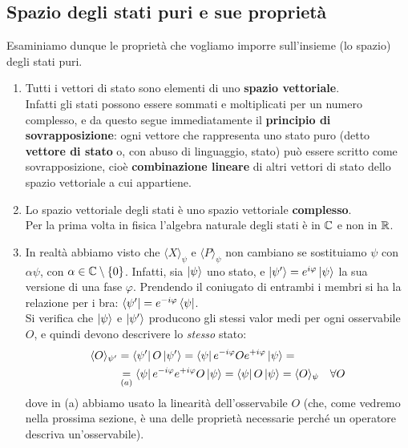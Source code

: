 \documentclass[FisicaTeorica.tex]{subfiles}
\begin{document}
\subsection{Spazio degli stati puri e sue proprietà}
Esaminiamo dunque le proprietà che vogliamo imporre sull'insieme (lo spazio) degli stati puri.
\begin{enumerate}
    \item Tutti i vettori di stato sono elementi di uno \textbf{spazio vettoriale}. \\
    Infatti gli stati possono essere sommati e moltiplicati per un numero complesso, e da questo segue immediatamente il \textbf{principio di sovrapposizione}: ogni vettore che rappresenta uno stato puro (detto \textbf{vettore di stato} o, con abuso di linguaggio, stato) può essere scritto come sovrapposizione, cioè \textbf{combinazione lineare} di altri vettori di stato dello spazio vettoriale a cui appartiene.
    \item Lo spazio vettoriale degli stati è uno spazio vettoriale \textbf{complesso}. \\
    Per la prima volta in fisica l'algebra naturale degli stati è in $\mathbb{C}$ e non in $\mathbb{R}$.
    \item In realtà abbiamo visto che $\langle X\rangle_\psi$ e $\langle P\rangle_\psi$ non cambiano se sostituiamo $\psi$ con $\alpha \psi$, con $\alpha \in \mathbb{C}\setminus \{0\}$. Infatti, sia $\Ket{\psi}$ uno stato, e $\Ket{\psi'} = e^{i\varphi}\Ket{\psi}$ la sua versione  di una fase $\varphi$. Prendendo il coniugato di entrambi i membri si ha la relazione per i bra: $\Bra{\psi'} = e^{-i\varphi}\Bra{\psi}$.\\ Si verifica che $\Ket{\psi}$ e $\Ket{\psi'}$ producono gli stessi valor medi per ogni osservabile $O$, e quindi devono descrivere lo \textit{stesso} stato:
    \begin{align}
        \langle O \rangle_{\psi'} &= \Bra{\psi'}O\Ket{\psi'} = \Bra{\psi} e^{-i\varphi} O e^{+i\varphi} \Ket{\psi} =\\
        &\underset{(a)}{=} \Bra{\psi} e^{-i\varphi}e^{+i\varphi} O \Ket{\psi} = \Bra{\psi}O\Ket{\psi} = \langle O \rangle_\psi \quad \forall O
    \end{align}
    dove in (a) abbiamo usato la linearità dell'osservabile $O$ (che, come vedremo nella prossima sezione, è una delle proprietà necessarie perché un operatore descriva un'osservabile).\\

\end{enumerate}
\end{document}
